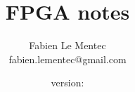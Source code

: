 \documentclass[12pt]{article}
\begin{document}

\newcommand{\note}[1]
{\newpage\section{#1}\label{note:#1}}

\newcommand{\topics}[1]
{\paragraph{}\small{\textit{topics: #1}}}

\newcommand{\related}[1]
{\paragraph{}\small{\textit{related notes: \ref{note:#1}}}}

\newcommand{\todo}[1]
{\paragraph{}\textbf{TODO}: #1}

{\newline\lstset{language=VHDL, frame=single}}{}

{\newline\lstset{language=TCL, frame=single}}{}

{\newline\lstset{frame=single}}{}

\newcommand{\longurl}[2]
{\url{#1#2}}

\newcommand{\longlongurl}[3]
{\url{#1#2#3}}




\title{FPGA notes}
\author{Fabien Le Mentec \\ fabien.lementec@gmail.com}

{}{\newcommand{\version}{none}}
\date{\small{version: \version}}

\maketitle
\end{document}
